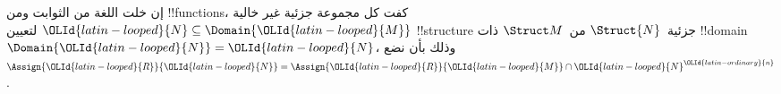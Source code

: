 \documentclass[../../../include/open-logic-section]{subfiles}
\begin{document}
\begin{rem}
إن خلت اللغة من الثوابت ومن !!{function}s، كفت كل مجموعة جزئية غير
خالية ${\OLId{latin-looped}{N}} \subseteq \Domain{{\OLId{latin-looped}{M}}}$ لتعيين !!{structure} جزئية~$\Struct{N}$
من~$\Struct M$ ذات !!{domain}~$\Domain{{\OLId{latin-looped}{N}}} = {\OLId{latin-looped}{N}}$، وذلك بأن نضع
$\Assign{{\OLId{latin-looped}{R}}}{{\OLId{latin-looped}{N}}} = \Assign{{\OLId{latin-looped}{R}}}{{\OLId{latin-looped}{M}}} \cap {\OLId{latin-looped}{N}}^{\OLId{latin-ordinary}{n}}$.
\end{rem}

\end{document}
